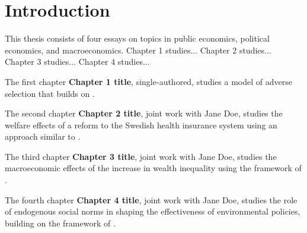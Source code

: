 \chapter*{Introduction}

This thesis consists of four essays on topics in public economics, political economics, and macroeconomics. Chapter 1 studies... Chapter 2 studies... Chapter 3 studies... Chapter 4 studies...

The first chapter \textbf{Chapter 1 title}, single-authored, studies a model of adverse selection that builds on \citet{akerlof1970market}. \lipsum[1-4]

The second chapter \textbf{Chapter 2 title}, joint work with Jane Doe, studies the welfare effects of a reform to the Swedish health insurance system using an approach similar to \citet{einav2010estimating}. \lipsum[1-4]

The third chapter \textbf{Chapter 3 title}, joint work with Jane Doe, studies the macroeconomic effects of the increase in wealth inequality using the framework of \citet{krusell1998income}. \lipsum[1-4]

The fourth chapter \textbf{Chapter 4 title}, joint work with Jane Doe, studies the role of endogenous social norms in shaping the effectiveness of environmental policies, building on the framework of \citet{besley2023political}. \lipsum[1-4]

\newpage{}
\printbibliography[heading=subbibliography]
